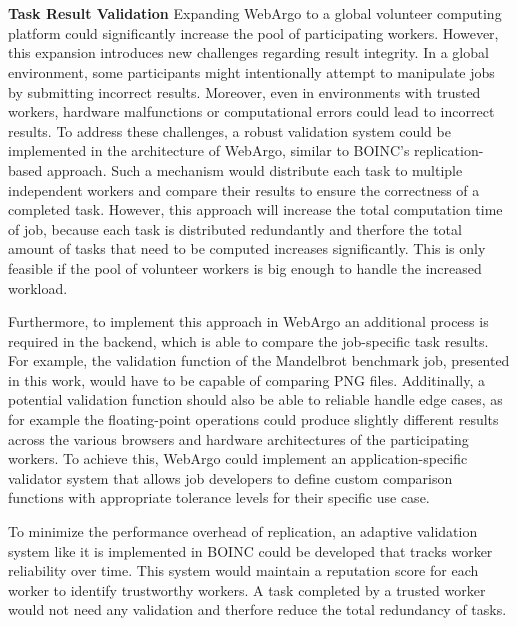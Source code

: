 \\~\\
\textbf{Task Result Validation}
Expanding WebArgo to a global volunteer computing platform could significantly increase the pool of participating workers. However, this expansion introduces new challenges regarding result integrity. In a global environment, some participants might intentionally attempt to manipulate jobs by submitting incorrect results. Moreover, even in environments with trusted workers, hardware malfunctions or computational errors could lead to incorrect results. To address these challenges, a robust validation system could be implemented in the architecture of WebArgo, similar to \ac{BOINC}'s replication-based approach. Such a mechanism would distribute each task to multiple independent workers and compare their results to ensure the correctness of a completed task. However, this approach will increase the total computation time of job, because each task is distributed redundantly and therfore the total amount of tasks that need to be computed increases significantly. This is only feasible if the pool of volunteer workers is big enough to handle the increased workload.

Furthermore, to implement this approach in WebArgo an additional process is required in the backend, which is able to compare the job-specific task results. For example, the validation function of the Mandelbrot benchmark job, presented in this work, would have to be capable of comparing \acs{PNG} files. Additinally, a potential validation function should also be able to reliable handle edge cases, as for example the floating-point operations could produce slightly different results across the various browsers and hardware architectures of the participating workers. To achieve this, WebArgo could implement an application-specific validator system that allows job developers to define custom comparison functions with appropriate tolerance levels for their specific use case.   

To minimize the performance overhead of replication, an adaptive validation system like it is implemented in \ac{BOINC} could be developed that tracks worker reliability over time. This system would maintain a reputation score for each worker to identify trustworthy workers. A task completed by a trusted worker would not need any validation and therfore reduce the total redundancy of tasks. 

